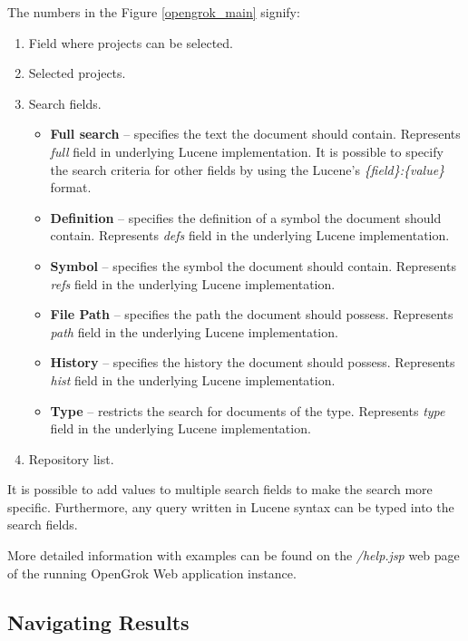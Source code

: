The numbers in the Figure \ref{opengrok_main} signify:
\begin{enumerate}
    \item Field where projects can be selected.
    \item Selected projects.
    \item Search fields.
       \begin{itemize}
        \item \textbf{Full search} – specifies the text the document should contain. Represents \textit{full} field in
        underlying Lucene implementation. It is possible to specify the search criteria for other fields by using the
        Lucene's \textit{\{field\}:\{value\}} format.
        \item \textbf{Definition} – specifies the definition of a symbol the document should contain.
        Represents \textit{defs} field in the underlying Lucene implementation.
        \item \textbf{Symbol} – specifies the symbol the document should contain.
        Represents \textit{refs} field in the underlying Lucene implementation.
        \item \textbf{File Path} – specifies the path the document should possess.
        Represents \textit{path} field in the underlying Lucene implementation.
        \item \textbf{History} – specifies the history the document should possess.
        Represents \textit{hist} field in the underlying Lucene implementation.
        \item \textbf{Type} – restricts the search for documents of the type.
        Represents \textit{type} field in the underlying Lucene implementation.
       \end{itemize}
    \item Repository list.
\end{enumerate}

It is possible to add values to multiple search fields to make the search more specific. Furthermore, any query written
in Lucene syntax can be typed into the search fields.

More detailed information with examples can be found on the \textit{/help.jsp} web page of the running OpenGrok Web application instance.

\subsection{Navigating Results}

